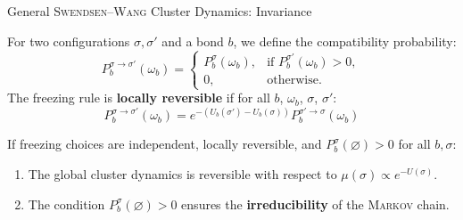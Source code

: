 \documentclass[A4,svgnames,9pt,aspectratio=169]{beamer}
\begin{document}
\begin{frame}{General \textsc{Swendsen}--\textsc{Wang} Cluster Dynamics: Invariance}
  \begin{definition}
    For two configurations $\sigma, \sigma'$ and a bond $b$, we define the compatibility probability:
    \begin{equation*}
        P_b^{\sigma\to\sigma'}(\omega_b)
        =
        \begin{cases}
            P_b^\sigma(\omega_b), & \text{if } P_b^{\sigma'}(\omega_b) > 0, \\
            0, & \text{otherwise.}
        \end{cases}
    \end{equation*}
    The freezing rule is \textbf{locally reversible} if for all $b$, $\omega_b$, $\sigma$, $\sigma'$:
    \begin{equation*}
        P_b^{\sigma \to \sigma'}(\omega_b) = e^{-\left(U_b(\sigma') - U_b(\sigma)\right)} P_b^{\sigma' \to \sigma}(\omega_b)
    \end{equation*}
  \end{definition}

  \begin{theorem}
    If freezing choices are independent, locally reversible, and $P_b^\sigma(\varnothing) > 0$ for all $b, \sigma$:
    \begin{enumerate}
      \item The global cluster dynamics is reversible with respect to $\mu(\sigma) \propto e^{-U(\sigma)}$.
      \item The condition $P_b^\sigma(\varnothing) > 0$ ensures the \textbf{irreducibility} of the \textsc{Markov} chain.
    \end{enumerate}
  \end{theorem}
\end{frame}
\end{document}
